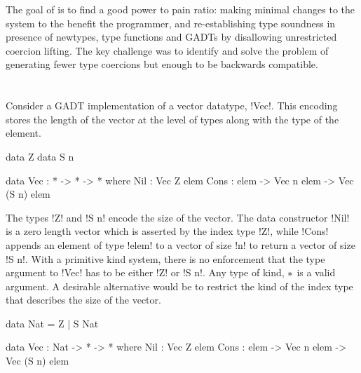 \documentclass[screen,nonacm,manuscript,review]{acmart} %
\begin{document}
The goal of \SFR is to find a good power to pain ratio: making
minimal changes to the system to the benefit the programmer, and
re-establishing type soundness in presence of newtypes, type functions
and GADTs by disallowing unrestricted coercion lifting. The key
challenge was to identify and solve the problem of generating fewer
type coercions but enough to be backwards compatible.

\section{\SFP}\label{sec:sfp} %
Consider a GADT implementation of a vector datatype, !Vec!.
This encoding stores the length of the vector at the level of types
along with the type of the element.

\begin{minipage}[ht]{0.4\linewidth}
\begin{code}
        data Z
        data S n
\end{code}
\end{minipage}%
\begin{minipage}[ht]{0.4\linewidth}
\begin{code}
    data Vec : * -> * -> * where
       Nil : Vec Z elem
       Cons : elem -> Vec n elem -> Vec (S n) elem
\end{code}
\end{minipage}

The types !Z! and !S n! encode the size of the vector. The data
constructor !Nil! is a zero length vector which is asserted by the
index type !Z!, while !Cons! appends an element of type !elem! to a
vector of size !n! to return a vector of size !S n!. With a primitive
kind system, there is no enforcement that the type argument to !Vec!
has to be either !Z! or !S n!. Any type of kind, $\ast$ is a valid
argument. A desirable alternative would be to restrict the kind
of the index type that describes the size of the vector.

\begin{minipage}[ht]{0.4\linewidth}
\begin{code}
         data Nat = Z | S Nat
\end{code}
\end{minipage}%
\begin{minipage}[ht]{0.4\linewidth}
\begin{code}
     data Vec : Nat -> * -> * where
        Nil : Vec Z elem
        Cons : elem -> Vec n elem -> Vec (S n) elem
\end{code}
\end{minipage}
\end{document}

